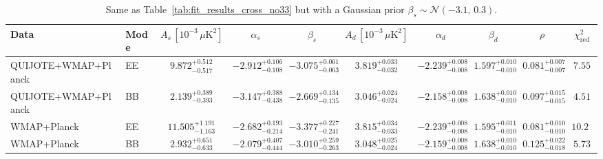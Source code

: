 \begin{table}[h]
\centering
\scriptsize
\setlength{\tabcolsep}{4pt}
\caption{Same as Table~\ref{tab:fit_results_cross_no33} but with a Gaussian prior $\beta_s \sim \mathcal{N}(-3.1,\,0.3)$.}
\label{tab:fit_results_cross_no33_prior_betas}
\begin{tabular}{llcccccccc}
\toprule
Data & Mode & $A_s\,[10^{-3}\,\mu\mathrm{K}^2]$ & $\alpha_s$ & $\beta_s$ & $A_d\,[10^{-3}\,\mu\mathrm{K}^2]$ & $\alpha_d$ & $\beta_d$ & $\rho$ & $\chi^2_\mathrm{red}$ \\
\midrule
QUIJOTE+WMAP+Planck & EE & $9.872^{+0.512}_{-0.517}$ & $-2.912^{+0.106}_{-0.108}$ & $-3.075^{+0.061}_{-0.063}$ & $3.819^{+0.033}_{-0.032}$ & $-2.239^{+0.008}_{-0.008}$ & $1.597^{+0.010}_{-0.010}$ & $0.081^{+0.007}_{-0.007}$ & $7.55$ \\
QUIJOTE+WMAP+Planck & BB & $2.139^{+0.389}_{-0.393}$ & $-3.147^{+0.388}_{-0.438}$ & $-2.669^{+0.134}_{-0.135}$ & $3.046^{+0.024}_{-0.024}$ & $-2.158^{+0.008}_{-0.008}$ & $1.638^{+0.010}_{-0.010}$ & $0.097^{+0.015}_{-0.015}$ & $4.51$ \\
WMAP+Planck & EE & $11.505^{+1.191}_{-1.163}$ & $-2.682^{+0.193}_{-0.214}$ & $-3.377^{+0.227}_{-0.241}$ & $3.815^{+0.034}_{-0.033}$ & $-2.239^{+0.008}_{-0.008}$ & $1.595^{+0.011}_{-0.010}$ & $0.081^{+0.010}_{-0.010}$ & $10.22$ \\
WMAP+Planck & BB & $2.932^{+0.651}_{-0.633}$ & $-2.079^{+0.407}_{-0.444}$ & $-3.010^{+0.259}_{-0.263}$ & $3.048^{+0.025}_{-0.024}$ & $-2.159^{+0.008}_{-0.008}$ & $1.638^{+0.010}_{-0.010}$ & $0.125^{+0.022}_{-0.018}$ & $5.73$ \\
\bottomrule
\end{tabular}
\end{table}
